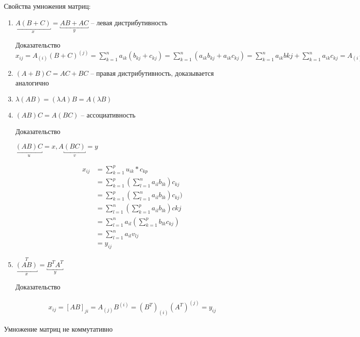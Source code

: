 Свойства умножения матриц:
\begin{enumerate}
    \item 
        $\underbracket{A(B + C)}_x = \underbracket{AB + AC}_y$ -- левая дистрибутивность
    
        Доказательство
        $ x_{ij} = A_{(i)} (B + C)^{(j)} = \sum_{k=1}^n a_{ik} (b_{kj} + c_{kj}) = \sum_{k=1}^n (a_{ik} b_{kj} + a_{ik} c_{kj}) = \sum_{k=1}^n a_{ik} b{kj} + \sum_{k=1}^n a_{ik} c_{kj} = A_{(i)} B^{(j)} + A_{(i)} C^{(j)} = y{ij} $
        \item $(A+B)C = AC + BC$ -- правая дистрибутивность, доказывается аналогично
        \item $\lambda(AB) = (\lambda A) B = A (\lambda B)$
        \item $(AB)C = A(BC)$ -- ассоциативность

        Доказательство
        
        $\underbracket{(AB)C}_u = x, A\underbracket{(BC)}_v = y$

        \begin{align*}
            x_{ij} &= \sum_{k=1}^p u_{ik} * c_{kp} \\ 
            &= \sum_{k=1}^p (\sum_{l=1}^n a_{il} b_{lk}) c_{kj} \\ 
            &= \sum_{k=1}^p (\sum_{l=1}^n a_{il} b_{lk}) c_{kj}) \\ 
            &= \sum_{l=1}^n (\sum_{k=1}^p a_{il} b_{lk}) c{kj} \\ 
            &= \sum_{l=1}^n a_{il} (\sum_{k=1}^p b_{lk} c_{kj}) \\ 
            &= \sum_{l=1}^n a_{il} v_{lj} \\ 
            &= y_{ij}
        \end{align*}

    \item 
        $\underbracket{(AB)}_x^T = \underbracket{B^T A^T}_y$
        
        Доказательство

        \begin{align*}
            x_{ij} = [AB]_{ji} 
            = A_{(j)} B^{(i)} 
            = (B^T)_{(i)} (A^T)^{(j)}
            = y_{ij}
        \end{align*}
\end{enumerate}

Умножение матриц не коммутативно

